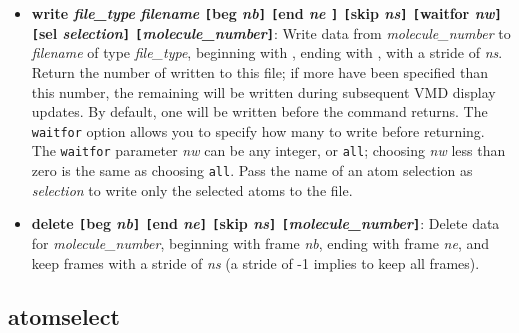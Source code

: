 \begin{itemize}
Read data for {\it molecule\_number} from {\it filename} of type {\it
file\_type}, beginning with , ending with \timestep
{\it ne}, with a stride of {\it ns}.  Return the number of \timesteps
read from this file; if the file contains more than this number, the
remaining \timesteps will be loaded during subsequent VMD display updates.
By default, one \timestep will be loaded before the command returns.
The {\tt waitfor} option allows you to specify how
many \timesteps to load before returning.  The {\tt waitfor} parameter
{\it nw} can be any integer, or {\tt all}; choosing {\it nw} less than
zero is the same as choosing {\tt all}.  If \timesteps from other files
are still being loaded when the animate command is issued, these \timesteps
will be loaded first.

    \item {\bf write {\it file\_type} {\it filename} {\tt [}beg {\it nb}{\tt ]} {\tt [}end {\it ne}
{\tt ]} {\tt [}skip {\it ns}{\tt ]}  {\tt [}waitfor {\it nw}{\tt ]}
           {\tt [}sel {\it selection}{\tt ]} 
           {\tt [}{\it molecule\_number}{\tt ]}}: 
Write data from {\it molecule\_number} to {\it filename} of type {\it
file\_type}, beginning with , ending with ,
with a stride of {\it ns}.  Return the number of \timesteps written to
this file; if more \timesteps have been specified than this number, the
remaining \timesteps will be written during subsequent VMD display updates.
By default, one \timestep will be written before the command returns.
The {\tt waitfor} option allows you to specify how many \timesteps to
write before returning.  The {\tt waitfor} parameter {\it nw} can be any
integer, or {\tt all}; choosing {\it nw} less than zero is the same as
choosing {\tt all}.  Pass the name of an atom selection as {\it selection}
to write only the selected atoms to the file.

    \item {\bf delete {\tt [}beg {\it nb}{\tt ]} {\tt [}end {\it ne}{\tt ]} 
{\tt [}skip {\it ns}{\tt ]} 
          {\tt [}{\it molecule\_number}{\tt ]}}: Delete data for 
{\it molecule\_number}, beginning with 
          frame {\it nb}, ending with frame {\it ne}, and keep frames with a stride 
of {\it ns} (a stride of -1 implies to keep all frames).
\end{itemize}

\subsection{atomselect}
\label{ug:ui:text:atomselect}


